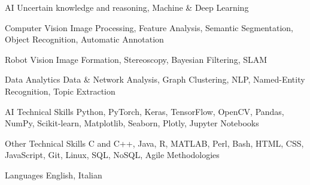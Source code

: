 

\begin{cvskills}

  \cvskill
    {AI} %
    {Uncertain knowledge and reasoning, Machine \& Deep Learning} %

  \cvskill
    {Computer Vision} %
    {Image Processing, Feature Analysis, Semantic Segmentation, Object Recognition, Automatic Annotation} %

  \cvskill
    {Robot Vision} %
    {Image Formation, Stereoscopy, Bayesian Filtering, SLAM} %

  \cvskill
    {Data Analytics} %
    {Data \& Network Analysis, Graph Clustering, NLP, Named-Entity Recognition, Topic Extraction} %


  \cvskill
    {AI Technical Skills} %
    {Python, PyTorch, Keras, TensorFlow, OpenCV, Pandas, NumPy, Scikit-learn, Matplotlib, Seaborn, Plotly, Jupyter Notebooks} %

\cvskill
{Other Technical Skills} %
{C and C++, Java, R, MATLAB, Perl, Bash, HTML, CSS, JavaScript, Git, Linux, SQL, NoSQL, Agile Methodologies} %

  \cvskill
    {Languages} %
    {English, Italian} %

\end{cvskills}
